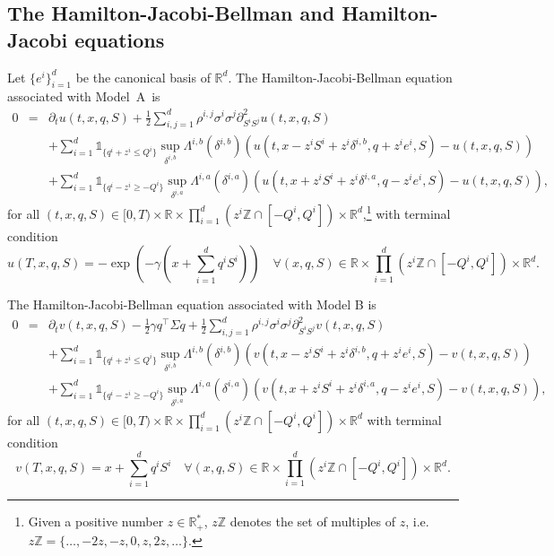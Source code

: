 \documentclass[preprint, 3p]{elsarticle}
\newcommand{\Rr}{{\mathbb{R}}}
\newcommand{\1}{{\chi}}
\begin{document}
\subsection{The Hamilton-Jacobi-Bellman and Hamilton-Jacobi equations}
\vspace{3mm}
Let $\{e^i\}_{i=1}^{d}$ be the canonical basis of $\Rr^d$. The Hamilton-Jacobi-Bellman equation associated with Model~A~is
\begin{eqnarray}
    0 &=&\partial_t u(t,x,q,S) + \frac 12 \sum_{i,j=1}^d \rho^{i,j} \sigma^i \sigma^j \partial^2_{S^i S^j} u(t,x,q,S) \nonumber \\
    &&+ \sum_{i=1}^d \mathds{1}_{\{q^i + z^i \le Q^i\}} \sup_{\delta^{i,b}} \Lambda^{i,b}(\delta^{i,b}) \left( u(t,x-z^iS^i + z^i \delta^{i,b}, q+z^i e^i, S) - u(t,x,q,S) \right) \nonumber \\
    &&+ \sum_{i=1}^d \mathds{1}_{\{q^i - z^i \ge- Q^i\}} \sup_{\delta^{i,a}} \Lambda^{i,a}(\delta^{i,a}) \left( u(t,x+z^iS^i + z^i \delta^{i,a}, q-z^i e^i, S) - u(t,x,q,S) \right), \label{HJB_A}
\end{eqnarray}
for all $(t,x,q,S) \in [0,T) \times \mathbb R \times \prod_{i=1}^d \left(z^i \mathbb Z \cap [-Q^i, Q^i]\right) \times \mathbb R^d$,\footnote{Given a positive number $z \in \mathbb R_+^*$, $z\mathbb Z$ denotes the set of multiples of $z$, i.e. $z\mathbb Z = \{\ldots, -2z,-z,0,z,2z,\ldots \}.$} with terminal condition $$u(T,x,q,S) = - \exp \left( - \gamma \left( x + \sum_{i=1}^d q^iS^i  \right) \right) \quad \forall (x,q,S) \in \mathbb R \times \prod_{i=1}^d \left(z^i \mathbb Z \cap  [-Q^i, Q^i]\right) \times \mathbb R^d.$$

The Hamilton-Jacobi-Bellman equation associated with Model B is
\begin{eqnarray}
    0 &=&\partial_t v(t,x,q,S) - \frac 12 \gamma q^\intercal \Sigma q + \frac 12 \sum_{i,j=1}^d \rho^{i,j} \sigma^i \sigma^j \partial^2_{S^i S^j} v(t,x,q,S) \nonumber \\
    &&+ \sum_{i=1}^d \mathds{1}_{\{q^i + z^i \le Q^i\}} \sup_{\delta^{i,b}} \Lambda^{i,b}(\delta^{i,b}) \left( v(t,x-z^iS^i + z^i \delta^{i,b}, q+z^i e^i, S) - v(t,x,q,S) \right) \nonumber \\
    &&+ \sum_{i=1}^d \mathds{1}_{\{q^i - z^i \ge - Q^i\}} \sup_{\delta^{i,a}} \Lambda^{i,a}(\delta^{i,a}) \left( v(t,x+z^iS^i + z^i \delta^{i,a}, q-z^i e^i, S) - v(t,x,q,S) \right), \label{HJB_B}
\end{eqnarray}
for all $(t,x,q,S) \in [0,T) \times \mathbb R \times \prod_{i=1}^d \left(z^i \mathbb Z \cap [-Q^i, Q^i]\right) \times \mathbb R^d$ with terminal condition $$v(T,x,q,S) =  x + \sum_{i=1}^d q^iS^i \quad \forall (x,q,S) \in \mathbb R \times \prod_{i=1}^d \left(z^i \mathbb Z \cap [-Q^i, Q^i]\right) \times \mathbb R^d.$$
\end{document}
